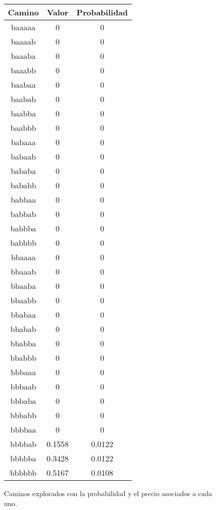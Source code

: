 \begin{figure}[hbpt]
\begin{minipage}{0.48\textwidth}
\begin{center}
\begin{tabular}{|c|c|c|}
\hline
\textbf{Camino} & \textbf{Valor} & \textbf{Probabilidad} \\
\hline
baaaaa  & 0 & 0 \\
baaaab  & 0 & 0 \\
baaaba  & 0 & 0 \\
baaabb  & 0 & 0 \\
baabaa  & 0 & 0 \\
baabab  & 0 & 0 \\
baabba  & 0 & 0 \\
baabbb  & 0 & 0 \\
babaaa  & 0 & 0 \\
babaab  & 0 & 0 \\
bababa  & 0 & 0 \\
bababb  & 0 & 0 \\
babbaa  & 0 & 0 \\
babbab  & 0 & 0 \\
babbba  & 0 & 0 \\
babbbb  & 0 & 0 \\
bbaaaa  & 0 & 0 \\
bbaaab  & 0 & 0 \\
bbaaba  & 0 & 0 \\
bbaabb  & 0 & 0 \\
bbabaa  & 0 & 0 \\
bbabab  & 0 & 0 \\
bbabba  & 0 & 0 \\
bbabbb  & 0 & 0 \\
bbbaaa  & 0 & 0 \\
bbbaab  & 0 & 0 \\
bbbaba  & 0 & 0 \\
bbbabb  & 0 & 0 \\
bbbbaa  & 0 & 0 \\
bbbbab  &  0.1558  &  0.0122  \\
bbbbba  &  0.3428  &  0.0122  \\
bbbbbb  &  0.5167  &  0.0108  \\
\hline
\end{tabular}
\end{center}
\end{minipage}
\caption{Caminos explorados con la probabilidad y el precio asociados a cada uno.}
\label{fig:2_3c}
\end{figure}


